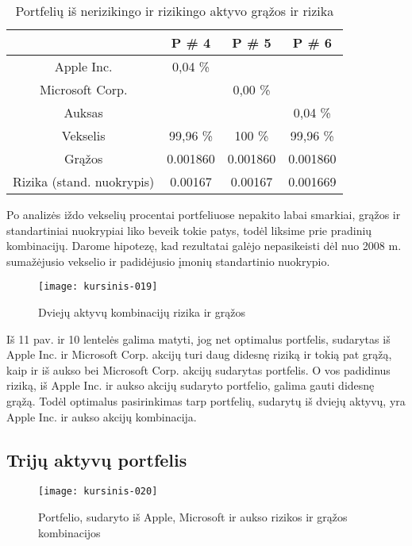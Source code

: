 \documentclass[12pt, a14paper, lithuanian]{article}
\begin{document}
\begin{table}[ht]
\begin{center}
\begin{tabular}{cccc}
  \hline
 & P \# 4 & P \# 5 & P \# 6 \\ 
  \hline
Apple Inc. & 0,04 \% &  &  &  \\
\hline
 Microsoft Corp. &  & 0,00 \% &  &  \\ 
   \hline
   Auksas & & & 0,04 \% &\\
   \hline
   Vekselis & 99,96 \% & 100 \% & 99,96 \% &\\
   \hline
   Grąžos & 0.001860 & 0.001860 & 0.001860 & \\
   \hline
   Rizika (stand. nuokrypis) & 0.00167 & 0.00167 & 0.001669 & \\
   \hline
\end{tabular}
\end{center}
\caption{Portfelių iš nerizikingo ir rizikingo aktyvo grąžos ir rizika}
\end{table}

Po analizės iždo vekselių procentai portfeliuose nepakito labai smarkiai, grąžos ir standartiniai nuokrypiai liko beveik tokie patys, todėl liksime prie pradinių kombinacijų. Darome hipotezę, kad rezultatai galėjo nepasikeisti dėl nuo 2008 m. sumažėjusio vekselio ir padidėjusio įmonių standartinio nuokrypio.




\begin{figure}[H]
  \centering
\texttt{[image: kursinis-019]}
  \caption{Dviejų aktyvų kombinacijų rizika ir grąžos}
\end{figure}  

Iš 11 pav. ir 10 lentelės galima matyti, jog net optimalus portfelis, sudarytas iš Apple Inc. ir Microsoft Corp. akcijų turi daug
didesnę riziką ir tokią pat grąžą, kaip ir iš aukso bei Microsoft Corp. akcijų sudarytas portfelis. O vos padidinus riziką,
iš Apple Inc. ir aukso akcijų sudaryto portfelio, galima gauti didesnę grąžą. Todėl optimalus pasirinkimas
tarp portfelių, sudarytų iš dviejų aktyvų, yra Apple Inc. ir aukso akcijų kombinacija.

           
\subsection{Trijų aktyvų portfelis}
 
\begin{figure}[H]
  \centering
\texttt{[image: kursinis-020]}
  \caption{Portfelio, sudaryto iš Apple, Microsoft ir aukso rizikos ir grąžos kombinacijos}
\end{figure}
\end{document}
